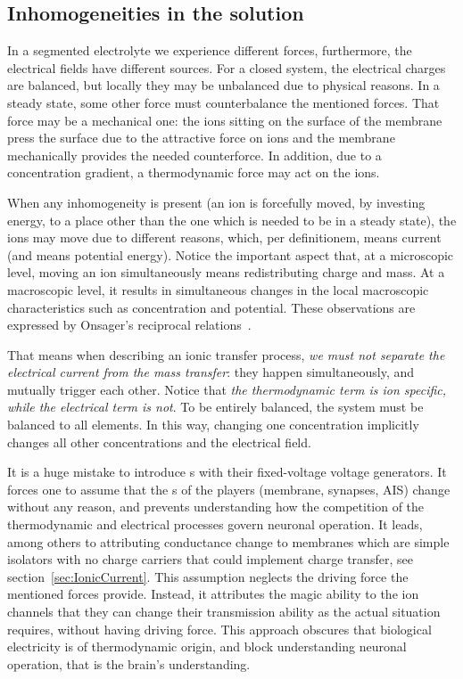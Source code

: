 \subsection[Inhomogeneities]{Inhomogeneities in the solution\label{sec:Physics-ElectrolyteInhomogeneity}}

In a segmented electrolyte we experience different forces, furthermore, the electrical fields 
have different sources. For a closed system, the electrical charges are balanced, but locally they may be unbalanced due to physical reasons. 
In a steady state, some other force must counterbalance
the mentioned forces. That force may be a mechanical one:
the ions sitting on the surface of the membrane press the
surface due to the attractive force on ions and the membrane mechanically provides the needed counterforce.
In addition, due to a concentration gradient, a thermodynamic force may act on the ions.


When any inhomogeneity is present (an ion is forcefully moved, by investing energy, to a place other than the one which is needed to be in a steady state), the ions may move due to different reasons, which, per definitionem, means current (and means potential energy).
Notice the important aspect that, at a microscopic level, moving an ion simultaneously
means redistributing charge and mass. At a macroscopic level, it results in simultaneous changes in the local macroscopic characteristics such as concentration and potential. These observations are expressed by
Onsager's reciprocal relations~\cite{OnsagerExperimental:1959}.


That means when describing an ionic transfer process, \textit{we must not separate the electrical current from the mass transfer}: they happen simultaneously, and mutually trigger each other.
Notice that \textit{the thermodynamic term is ion specific, while the electrical term is not}. To be entirely balanced, the system must be balanced to all elements.
In this way, changing one concentration implicitly changes all other concentrations and the electrical field.

It is a huge mistake to introduce s with their fixed-voltage voltage generators. It forces one to assume that the
s of the players (membrane, synapses, \gls{AIS}) 
change 
without any reason, and prevents understanding how the competition of the thermodynamic and electrical processes govern neuronal operation.
It leads, among others to attributing conductance change to membranes  which are simple isolators with no charge carriers that could implement
charge transfer, see section~\ref{sec:IonicCurrent}.
This assumption neglects the driving force the mentioned forces provide. 
Instead, it attributes the magic ability to the ion channels that they
can change their transmission ability as the actual situation requires, without having driving force.
This approach obscures that biological electricity is of 
thermodynamic origin, and block understanding neuronal operation,
that is the brain's understanding.

